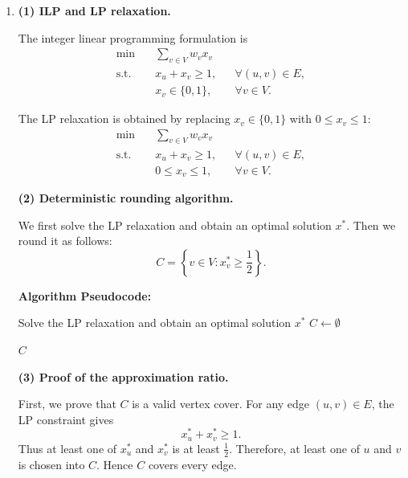 \documentclass[12pt,a4paper]{article}
\makeatletter
\newtheorem*{solution}{Solution}
\theoremstyle{definition}
\renewenvironment{solution}[1][Solution] {\par\pushQED{\qed}\normalfont\topsep6\p@\@plus6\p@\relax\trivlist\item[\hskip\labelsep\bfseries#1\@addpunct{.}]\ignorespaces}{\popQED\endtrivlist\@endpefalse} \makeatother
\makeatother
\begin{document}
\begin{enumerate}
\begin{solution}
    \textbf{(1) ILP and LP relaxation.}
    
    The integer linear programming formulation is
    \[
    \begin{aligned}
    \min \quad & \sum_{v\in V} w_v x_v \\
    \text{s.t.}\quad & x_u+x_v\ge 1, && \forall (u,v)\in E,\\
    & x_v\in \{0,1\}, && \forall v\in V.
    \end{aligned}
    \]
    
    The LP relaxation is obtained by replacing \(x_v\in\{0,1\}\) with \(0\le x_v\le 1\):
    \[
    \begin{aligned}
    \min \quad & \sum_{v\in V} w_v x_v \\
    \text{s.t.}\quad & x_u+x_v\ge 1, && \forall (u,v)\in E,\\
    & 0\le x_v\le 1, && \forall v\in V.
    \end{aligned}
    \]
    
    \textbf{(2) Deterministic rounding algorithm.}
    
    We first solve the LP relaxation and obtain an optimal solution \(x^*\). Then we round it as follows:
    \[
    C=\left\{v\in V:x_v^*\ge \frac12\right\}.
    \]
    
    \textbf{Algorithm Pseudocode:}
    
    \begin{minipage}{\linewidth}
    \begin{algorithm}[H]
    \caption{LP Rounding for Weighted Vertex Cover}
    
    Solve the LP relaxation and obtain an optimal solution \(x^*\)\;
    \(C\gets \emptyset\)\;
    
    
    \Return \(C\)\;
    \end{algorithm}
    \end{minipage}
    
    \textbf{(3) Proof of the approximation ratio.}
    
    First, we prove that \(C\) is a valid vertex cover. For any edge \((u,v)\in E\), the LP constraint gives
    \[
    x_u^*+x_v^*\ge 1.
    \]
    Thus at least one of \(x_u^*\) and \(x_v^*\) is at least \(\frac12\). Therefore, at least one of \(u\) and \(v\) is chosen into \(C\). Hence \(C\) covers every edge.
    

\end{solution}
\end{enumerate}
\end{document}
